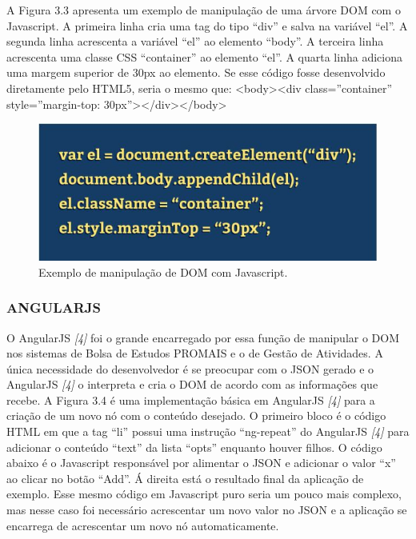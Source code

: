 \documentclass[
  12pt,				%
  openany,
  oneside,
  a4paper,			%
  english,			%
  brazil
]{article}
\numberwithin{figure}{section}
\numberwithin{table}{section}
\begin{document}
A Figura 3.3 apresenta um exemplo de manipulação de uma árvore DOM com o Javascript. A primeira linha cria uma tag do tipo “div” e salva na variável “el”. A segunda linha acrescenta a variável “el” ao elemento “body”. A terceira linha acrescenta uma classe CSS
“container” ao elemento “el”. A quarta linha adiciona uma margem superior de 30px ao elemento.
Se esse código fosse desenvolvido diretamente pelo HTML5, seria o mesmo que:
<body><div class=”container” style=”margin-top: 30px”></div></body>

\begin{figure}[!h]
\centering
\includegraphics[width=1\textwidth]{figura33}
\caption{Exemplo de manipulação de DOM com Javascript.}
\end{figure}


\subsubsection{ANGULARJS}

O AngularJS \textit{[4]} foi o grande encarregado por essa função de manipular o DOM nos sistemas de Bolsa de Estudos PROMAIS e o de Gestão de Atividades. A única necessidade do desenvolvedor é se preocupar com o JSON gerado e o AngularJS \textit{[4]} o interpreta e cria o DOM de acordo com as informações que recebe.
A Figura 3.4 é uma implementação básica em AngularJS \textit{[4]} para a criação de um novo nó com o conteúdo desejado. O primeiro bloco é o código HTML em que a tag “li” possui uma instrução “ng-repeat” do AngularJS \textit{[4]} para adicionar o conteúdo “text” da lista “opts” enquanto houver filhos. O código abaixo é o Javascript responsável por alimentar o JSON e adicionar o valor “x” ao clicar no botão “Add”. Á direita está o resultado final da aplicação de exemplo.
Esse mesmo código em Javascript puro seria um pouco mais complexo, mas nesse caso foi necessário acrescentar um novo valor no JSON e a aplicação se encarrega de acrescentar um novo nó automaticamente.
\end{document}
